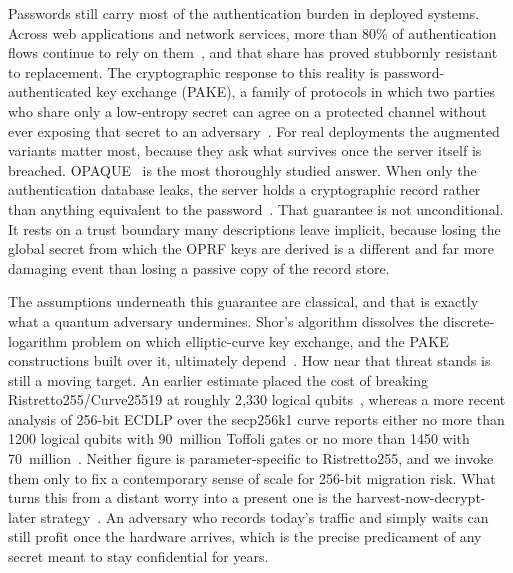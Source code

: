 \documentclass[preprint,12pt]{elsarticle}
\newcommand{\codeid}[1]{\textsf{#1}}
\theoremstyle{remark}
\begin{document}
Passwords still carry most of the authentication burden in deployed systems. Across web applications and network services, more than 80\% of authentication flows continue to rely on them~\cite{bonneau2012,florencio2007}, and that share has proved stubbornly resistant to replacement. The cryptographic response to this reality is password-authenticated key exchange (PAKE), a family of protocols in which two parties who share only a low-entropy secret can agree on a protected channel without ever exposing that secret to an adversary~\cite{bellare2000}. For real deployments the augmented variants matter most, because they ask what survives once the server itself is breached. OPAQUE~\cite{jarecki2018} is the most thoroughly studied answer. When only the authentication database leaks, the server holds a cryptographic record rather than anything equivalent to the password~\cite{ietf-opaque}. That guarantee is not unconditional. It rests on a trust boundary many descriptions leave implicit, because losing the global secret from which the OPRF keys are derived is a different and far more damaging event than losing a passive copy of the record store.

The assumptions underneath this guarantee are classical, and that is exactly what a quantum adversary undermines. Shor's algorithm dissolves the discrete-logarithm problem on which elliptic-curve key exchange, and the PAKE constructions built over it, ultimately depend~\cite{shor1994,bernstein2017}. How near that threat stands is still a moving target. An earlier estimate placed the cost of breaking Ristretto255/Curve25519 at roughly 2{,}330 logical qubits~\cite{roetteler2017}, whereas a more recent analysis of 256-bit ECDLP over the \codeid{secp256k1} curve reports either no more than 1200 logical qubits with 90~million Toffoli gates or no more than 1450 with 70~million~\cite{babbush2026}. Neither figure is parameter-specific to Ristretto255, and we invoke them only to fix a contemporary sense of scale for 256-bit migration risk. What turns this from a distant worry into a present one is the harvest-now-decrypt-later strategy~\cite{mosca2018}. An adversary who records today's traffic and simply waits can still profit once the hardware arrives, which is the precise predicament of any secret meant to stay confidential for years.
\end{document}
